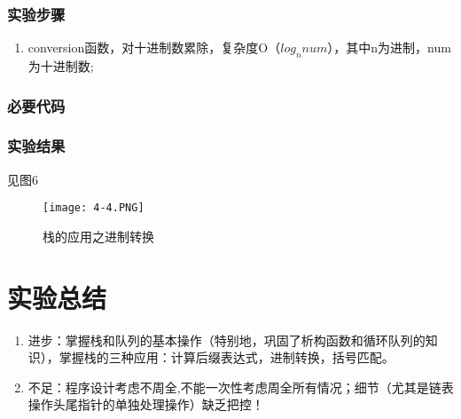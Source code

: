 \subsubsection{实验步骤}
\begin{enumerate}
\item conversion函数，对十进制数累除，复杂度O（$log_n num$），其中n为进制，num为十进制数;
\end{enumerate}
\subsubsection{必要代码}

\subsubsection{实验结果}见图6
	\begin{figure}[!bthp]
	\centering
        \texttt{[image: 4-4.PNG]}
        \caption{栈的应用之进制转换}
      \end{figure}




\section{实验总结}
\begin{enumerate}
\item 进步：掌握栈和队列的基本操作（特别地，巩固了析构函数和循环队列的知识），掌握栈的三种应用：计算后缀表达式，进制转换，括号匹配。
\item 不足：程序设计考虑不周全,不能一次性考虑周全所有情况；细节（尤其是链表操作头尾指针的单独处理操作）缺乏把控！
\end{enumerate}

